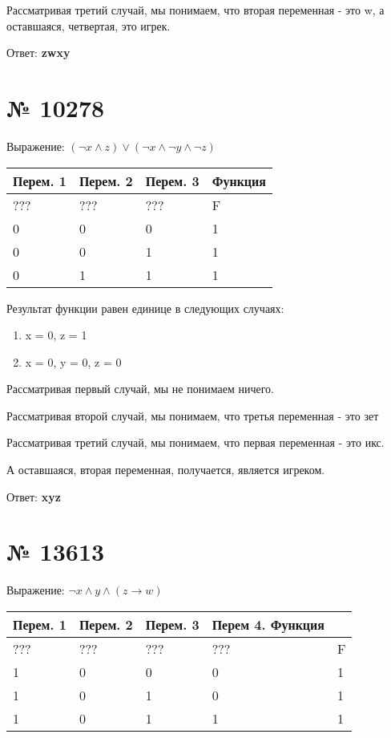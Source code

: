 \documentclass[11pt]{article} %
\begin{document}
Рассматривая третий случай, мы понимаем, что вторая переменная - это w, а оставшаяся, четвертая, это игрек.

Ответ: \textbf{zwxy}

\section{№ \textbf{10278}}

Выражение: $(\lnot{x} \land z) \lor (\lnot{x} \land \lnot{y} \land \lnot{z})$

\vspace{2mm}
\begin{tabular}{ | l | l | l | l | }
\hline
Перем. 1 & Перем. 2 & Перем. 3 & Функция \\ \hline
??? & ??? & ??? & F \\ \hline
0 & 0 & 0 & 1 \\ \hline
0 & 0 & 1 & 1 \\ \hline
0 & 1 & 1 & 1 \\ \hline
\end{tabular}

\vspace{2mm}

Результат функции равен единице в следующих случаях:

\begin{enumerate}
	\item x = 0, z = 1
	\item x = 0, y = 0, z = 0
\end{enumerate}

Рассматривая первый случай, мы не понимаем ничего.

Рассматривая второй случай, мы понимаем, что третья переменная - это зет

Рассматривая третий случай, мы понимаем, что первая переменная - это икс.

А оставшаяся, вторая переменная, получается, является игреком.

Ответ: \textbf{xyz}

\section{№ \textbf{13613}}

Выражение: $\lnot{x} \land y \land (z \rightarrow w)$

\vspace{2mm}
\begin{tabular}{ | l | l | l | l | l | }
\hline
Перем. 1 & Перем. 2 & Перем. 3 & Перем 4. Функция \\ \hline
??? & ??? & ??? & ??? & F \\ \hline
1 & 0 & 0 & 0 & 1 \\ \hline
1 & 0 & 1 & 0 & 1 \\ \hline
1 & 0 & 1 & 1 & 1 \\ \hline
\end{tabular}
\end{document}
